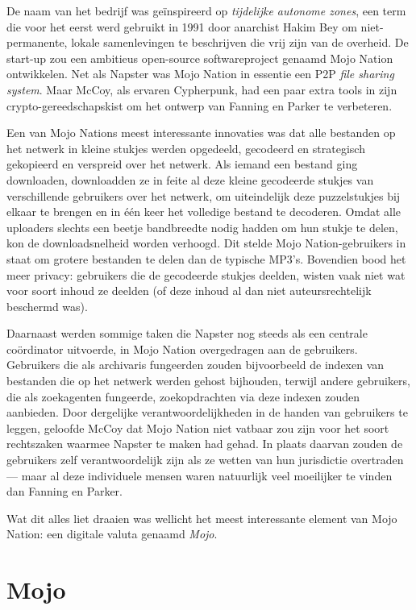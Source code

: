 \documentclass[
  a5paper,
  smalldemyvopaper,11pt,twoside,onecolumn,openright,extrafontsizes,
hidelinks]{memoir}
\begin{document}
De naam van het bedrijf was geïnspireerd op \emph{tijdelijke autonome
zones}, een term die voor het eerst werd gebruikt in 1991 door anarchist
Hakim Bey om niet-permanente, lokale samenlevingen te beschrijven die
vrij zijn van de overheid. De start-up zou een ambitieus open-source
softwareproject genaamd Mojo Nation ontwikkelen. Net als Napster was
Mojo Nation in essentie een P2P \emph{file sharing system}. Maar McCoy,
als ervaren Cypherpunk, had een paar extra tools in zijn
crypto-gereedschapskist om het ontwerp van Fanning en Parker te
verbeteren.

Een van Mojo Nations meest interessante innovaties was dat alle
bestanden op het netwerk in kleine stukjes werden opgedeeld, gecodeerd
en strategisch gekopieerd en verspreid over het netwerk. Als iemand een
bestand ging downloaden, downloadden ze in feite al deze kleine
gecodeerde stukjes van verschillende gebruikers over het netwerk, om
uiteindelijk deze puzzelstukjes bij elkaar te brengen en in één keer het
volledige bestand te decoderen. Omdat alle uploaders slechts een beetje
bandbreedte nodig hadden om hun stukje te delen, kon de downloadsnelheid
worden verhoogd. Dit stelde Mojo Nation-gebruikers in staat om grotere
bestanden te delen dan de typische MP3's. Bovendien bood het meer
privacy: gebruikers die de gecodeerde stukjes deelden, wisten vaak niet
wat voor soort inhoud ze deelden (of deze inhoud al dan niet
auteursrechtelijk beschermd was).

Daarnaast werden sommige taken die Napster nog steeds als een centrale
coördinator uitvoerde, in Mojo Nation overgedragen aan de gebruikers.
Gebruikers die als archivaris fungeerden zouden bijvoorbeeld de indexen
van bestanden die op het netwerk werden gehost bijhouden, terwijl andere
gebruikers, die als zoekagenten fungeerde, zoekopdrachten via deze
indexen zouden aanbieden. Door dergelijke verantwoordelijkheden in de
handen van gebruikers te leggen, geloofde McCoy dat Mojo Nation niet
vatbaar zou zijn voor het soort rechtszaken waarmee Napster te maken had
gehad. In plaats daarvan zouden de gebruikers zelf verantwoordelijk zijn
als ze wetten van hun jurisdictie overtraden --- maar al deze
individuele mensen waren natuurlijk veel moeilijker te vinden dan
Fanning en Parker.

Wat dit alles liet draaien was wellicht het meest interessante element
van Mojo Nation: een digitale valuta genaamd \emph{Mojo}.

\section{Mojo}\label{mojo}
\end{document}
